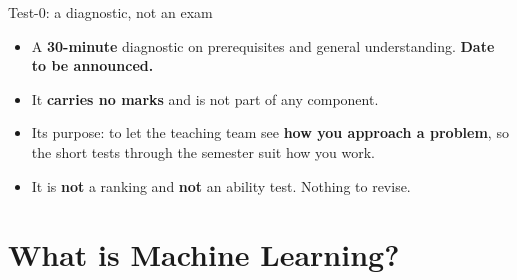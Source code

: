 \documentclass[aspectratio=169]{beamer}
\begin{document}
\begin{frame}{Test-0: a diagnostic, not an exam}
  \begin{itemize}[<+->]
    \item A \textbf{30-minute} diagnostic on prerequisites and general understanding. \textbf{Date to be announced.}
    \item It \textbf{carries no marks} and is not part of any component.
    \item Its purpose: to let the teaching team see \textbf{how you approach a problem}, so the short tests through the semester suit how you work.
    \item It is \textbf{not} a ranking and \textbf{not} an ability test. Nothing to revise.
  \end{itemize}
  \vspace{0.3em}
\end{frame}

\section{What is Machine Learning?}
\label{sec:whatisml}
\end{document}
